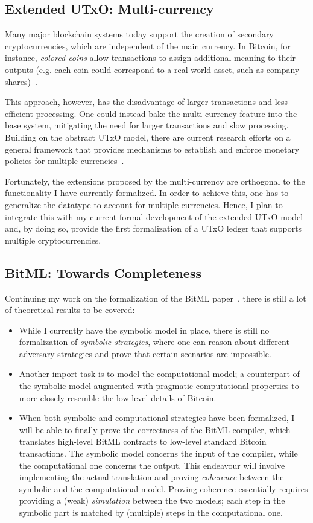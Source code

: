 \documentclass[acmsmall,nonacm=true,screen=true]{acmart}
\begin{document}
\subsection{Extended UTxO: Multi-currency}
Many major blockchain systems today support the creation of secondary cryptocurrencies, which are independent of the main  currency.
In Bitcoin, for instance, \textit{colored coins} allow transactions to assign additional meaning to their outputs
(e.g. each coin could correspond to a real-world asset, such as company shares)~\cite{coloredcoins}.

This approach, however, has the disadvantage of larger transactions and less efficient processing.
One could instead bake the multi-currency feature into the base system, mitigating the need for
larger transactions and slow processing.
Building on the abstract UTxO model, there are current research efforts on a general framework that provides mechanisms
to establish and enforce monetary policies for multiple currencies~\cite{multicurrency}.

Fortunately, the extensions proposed by the multi-currency are orthogonal to the functionality I have currently formalized.
In order to achieve this, one has to generalize the \inlineValue{} datatype to account for multiple currencies.
Hence, I plan to integrate this with my current formal development of the extended UTxO model and,
by doing so, provide the first formalization of a UTxO ledger that supports multiple cryptocurrencies.

\subsection{BitML: Towards Completeness}
Continuing my work on the formalization of the BitML paper~\cite{bitml},
there is still a lot of theoretical results to be covered:
\begin{itemize}
\item While I currently have the symbolic model in place, there is still no formalization of \textit{symbolic strategies},
where one can reason about different adversary strategies and prove that certain scenarios are impossible.
\item Another import task is to model the computational model; a counterpart of the symbolic model augmented
with pragmatic computational properties to more closely resemble the low-level details of Bitcoin.
\item When both symbolic and computational strategies have been formalized, I will be able to finally
prove the correctness of the BitML compiler, which translates high-level BitML contracts to
low-level standard Bitcoin transactions. The symbolic model concerns the input of the compiler, while
the computational one concerns the output.
This endeavour will involve implementing the actual translation and proving \textit{coherence} between the
symbolic and the computational model.
Proving coherence essentially requires providing a (weak) \textit{simulation} between the two models;
each step in the symbolic part is matched by (multiple) steps in the computational one.
\end{itemize}
\end{document}
